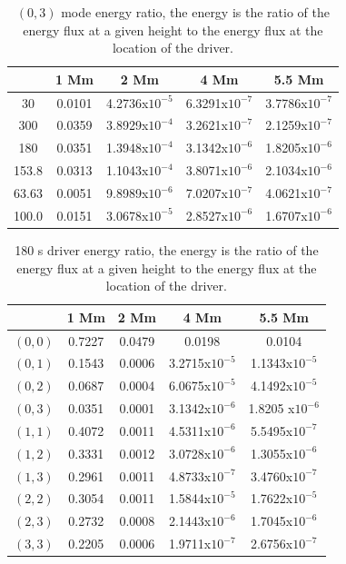 \documentclass[preprint,authoryear,12pt]{elsarticle}
\begin{document}
\begin{table}[h]
\centering
\begin{tabular}{c c c c c }
\hline
   &  1 Mm & 2 Mm & 4 Mm & 5.5 Mm \\
\hline
30 &  0.0101 &  4.2736x$10^{-5}$ & 6.3291x$10^{-7}$ & 3.7786x$10^{-7}$\\
\hline
300 & 0.0359 & 3.8929x$10^{-4}$ & 3.2621x$10^{-7}$ & 2.1259x$10^{-7}$\\
\hline
180 & 0.0351 &1.3948x$10^{-4}$ & 3.1342x$10^{-6}$ & 1.8205x$10^{-6}$\\
\hline
153.8 & 0.0313 & 1.1043x$10^{-4}$ & 3.8071x$10^{-6}$ & 2.1034x$10^{-6}$\\
\hline
63.63 & 0.0051 & 9.8989x$10^{-6}$ & 7.0207x$10^{-7}$ & 4.0621x$10^{-7}$\\
\hline
100.0 & 0.0151 & 3.0678x$10^{-5}$ & 2.8527x$10^{-6}$ & 1.6707x$10^{-6}$\\
\hline
\end{tabular} 
\caption{$(0, 3)$ mode energy ratio, the energy is the ratio of the energy flux at a given height to the energy flux at the location of the driver.}
\label{Table03mode}
\end{table}

\begin{table}[h]
\centering
\begin{tabular}{c c c c c }
\hline
   &  1 Mm & 2 Mm & 4 Mm & 5.5 Mm \\
\hline
$(0, 0)$ &  0.7227 & 0.0479 & 0.0198 & 0.0104 \\
\hline
$(0, 1)$ & 0.1543 & 0.0006 & 3.2715x$10^{-5}$ &  1.1343x$10^{-5}$\\
\hline
$(0, 2)$ & 0.0687 & 0.0004 & 6.0675x$10^{-5}$ &  4.1492x$10^{-5}$\\
\hline
$(0, 3)$ & 0.0351 & 0.0001 & 3.1342x$10^{-6}$ & 1.8205 x$10^{-6}$\\
\hline
$(1, 1)$ & 0.4072 & 0.0011 & 4.5311x$10^{-6}$ &  5.5495x$10^{-7}$\\
\hline
$(1, 2)$ & 0.3331 & 0.0012 & 3.0728x$10^{-6}$ &  1.3055x$10^{-6}$\\
\hline
$(1, 3)$ & 0.2961 & 0.0011 & 4.8733x$10^{-7}$ &  3.4760x$10^{-7}$\\
\hline
$(2, 2)$ & 0.3054 & 0.0011 & 1.5844x$10^{-5}$ &  1.7622x$10^{-5}$\\
\hline
$(2, 3)$ & 0.2732 & 0.0008 & 2.1443x$10^{-6}$ &  1.7045x$10^{-6}$\\
\hline
$(3, 3)$ & 0.2205 & 0.0006 & 1.9711x$10^{-7}$ &  2.6756x$10^{-7}$\\
\hline
\end{tabular} 
\caption{180 s driver energy ratio, the energy is the ratio of the energy flux at a given height to the energy flux at the location of the driver.}
\label{Table180mode}
\end{table}
\end{document}
